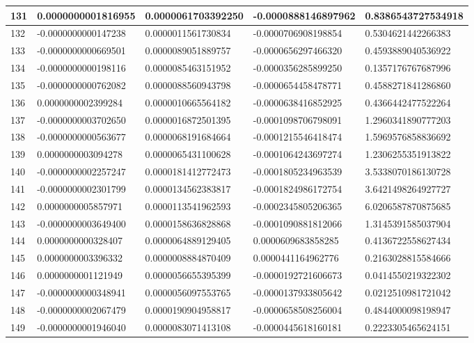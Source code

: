 \begin{center}
\begin{longtable}{|p{0.5cm}|p{3.5cm}|p{3.5cm}|p{3.5cm}|p{3.5cm}|}
\hline
131  & 0.0000000001816955  & 0.0000061703392250  & -0.0000888146897962  & 0.8386543727534918\\
\hline
132  & -0.0000000000147238  & 0.0000011561730834  & -0.0000706908198854  & 0.5304621442266383\\
\hline
133  & -0.0000000000669501  & 0.0000089051889757  & -0.0000656297466320  & 0.4593889040536922\\
\hline
134  & -0.0000000000198116  & 0.0000085463151952  & -0.0000356285899250  & 0.1357176767687996\\
\hline
135  & -0.0000000000762082  & 0.0000088560943798  & -0.0000654458478771  & 0.4588271841286860\\
\hline
136  & 0.0000000002399284  & 0.0000010665564182  & -0.0000638416852925  & 0.4366442477522264\\
\hline
137  & -0.0000000003702650  & 0.0000016872501395  & -0.0001098706798091  & 1.2960341890777203\\
\hline
138  & -0.0000000000563677  & 0.0000068191684664  & -0.0001215546418474  & 1.5969576858836692\\
\hline
139  & 0.0000000003094278  & 0.0000065431100628  & -0.0001064243697274  & 1.2306255351913822\\
\hline
140  & -0.0000000002257247  & 0.0000181412772473  & -0.0001805234963539  & 3.5338070186130728\\
\hline
141  & -0.0000000002301799  & 0.0000134562383817  & -0.0001824986172754  & 3.6421498264927727\\
\hline
142  & 0.0000000005857971  & 0.0000113541962593  & -0.0002345805206365  & 6.0206587870875685\\
\hline
143  & -0.0000000003649400  & 0.0000158636828868  & -0.0001090881812066  & 1.3145391585037904\\
\hline
144  & 0.0000000000328407  & 0.0000064889129405  & 0.0000609683858285  & 0.4136722558627434\\
\hline
145  & 0.0000000003396332  & 0.0000008884870409  & 0.0000441164962776  & 0.2163028815584666\\
\hline
146  & 0.0000000001121949  & 0.0000056655395399  & -0.0000192721606673  & 0.0414550219322302\\
\hline
147  & -0.0000000000348941  & 0.0000056097553765  & -0.0000137933805642  & 0.0212510981721042\\
\hline
148  & -0.0000000002067479  & 0.0000190904958817  & -0.0000658508256004  & 0.4844000098198947\\
\hline
149  & -0.0000000001946040  & 0.0000083071413108  & -0.0000445618160181  & 0.2223305465624151\\

\end{longtable}
\end{center}
